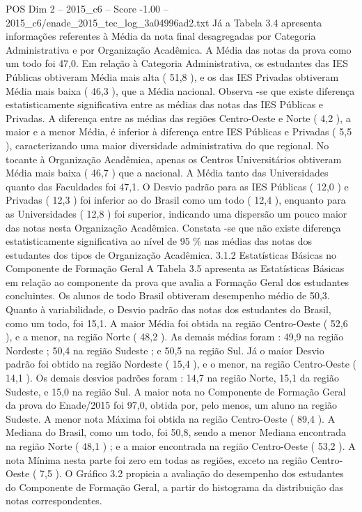 \begin{textsample}{POS Dim 2 – 2015\_c6 – Score -1.00 – 2015\_c6/enade\_2015\_tec\_log\_3a04996ad2.txt}
Já a Tabela 3.4 apresenta informações referentes à Média da nota final desagregadas por Categoria Administrativa e por Organização Acadêmica.
A Média das notas da prova como um todo foi 47,0.
Em relação à Categoria Administrativa, os estudantes das IES Públicas obtiveram Média mais alta ( 51,8 ), e os das IES Privadas obtiveram Média mais baixa ( 46,3 ), que a Média nacional.
Observa -se que existe diferença estatisticamente significativa entre as médias das notas das IES Públicas e Privadas.
A diferença entre as médias das regiões Centro-Oeste e Norte ( 4,2 ), a maior e a menor Média, é inferior à diferença entre IES Públicas e Privadas ( 5,5 ), caracterizando uma maior diversidade administrativa do que regional.
No tocante à Organização Acadêmica, apenas os Centros Universitários obtiveram Média mais baixa ( 46,7 ) que a nacional.
A Média tanto das Universidades quanto das Faculdades foi 47,1.
O Desvio padrão para as IES Públicas ( 12,0 ) e Privadas ( 12,3 ) foi inferior ao do Brasil como um todo ( 12,4 ), enquanto para as Universidades ( 12,8 ) foi superior, indicando uma dispersão um pouco maior das notas nesta Organização Acadêmica.
Constata -se que não existe diferença estatisticamente significativa ao nível de 95 \% nas médias das notas dos estudantes dos tipos de Organização Acadêmica. 3.1.2 Estatísticas Básicas no Componente de Formação Geral A Tabela 3.5 apresenta as Estatísticas Básicas em relação ao componente da prova que avalia a Formação Geral dos estudantes concluintes.
Os alunos de todo Brasil obtiveram desempenho médio de 50,3.
Quanto à variabilidade, o Desvio padrão das notas dos estudantes do Brasil, como um todo, foi 15,1.
A maior Média foi obtida na região Centro-Oeste ( 52,6 ), e a menor, na região Norte ( 48,2 ).
As demais médias foram : 49,9 na região Nordeste ; 50,4 na região Sudeste ; e 50,5 na região Sul.
Já o maior Desvio padrão foi obtido na região Nordeste ( 15,4 ), e o menor, na região Centro-Oeste ( 14,1 ).
Os demais desvios padrões foram : 14,7 na região Norte, 15,1 da região Sudeste, e 15,0 na região Sul.
A maior nota no Componente de Formação Geral da prova do Enade/2015 foi 97,0, obtida por, pelo menos, um aluno na região Sudeste.
A menor nota Máxima foi obtida na região Centro-Oeste ( 89,4 ).
A Mediana do Brasil, como um todo, foi 50,8, sendo a menor Mediana encontrada na região Norte ( 48,1 ) ; e a maior encontrada na região Centro-Oeste ( 53,2 ).
A nota Mínima nesta parte foi zero em todas as regiões, exceto na região Centro-Oeste ( 7,5 ).
O Gráfico 3.2 propicia a avaliação do desempenho dos estudantes do Componente de Formação Geral, a partir do histograma da distribuição das notas correspondentes.

\end{textsample}
